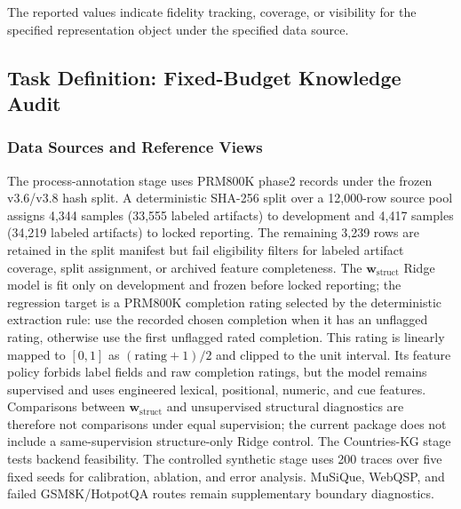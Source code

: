 \documentclass[a4paper,fleqn]{cas-sc}
\newcommand{\wstruct}{\ensuremath{\mathbf{w}_{\mathrm{struct}}}}
\begin{document}
The reported values indicate fidelity tracking, coverage, or visibility for the specified representation object under the specified data source.

\subsection{Task Definition: Fixed-Budget Knowledge Audit}
\label{sec:application-setup}

\subsubsection{Data Sources and Reference Views}

The process-annotation stage uses PRM800K phase2 records under the frozen v3.6/v3.8 hash split. A deterministic SHA-256 split over a 12,000-row source pool assigns 4,344 samples (33,555 labeled artifacts) to development and 4,417 samples (34,219 labeled artifacts) to locked reporting. The remaining 3,239 rows are retained in the split manifest but fail eligibility filters for labeled artifact coverage, split assignment, or archived feature completeness. The \wstruct{} Ridge model is fit only on development and frozen before locked reporting; the regression target is a PRM800K completion rating selected by the deterministic extraction rule: use the recorded chosen completion when it has an unflagged rating, otherwise use the first unflagged rated completion. This rating is linearly mapped to $[0,1]$ as $(\mathrm{rating}+1)/2$ and clipped to the unit interval. Its feature policy forbids label fields and raw completion ratings, but the model remains supervised and uses engineered lexical, positional, numeric, and cue features. Comparisons between \wstruct{} and unsupervised structural diagnostics are therefore not comparisons under equal supervision; the current package does not include a same-supervision structure-only Ridge control. The Countries-KG stage tests backend feasibility. The controlled synthetic stage uses 200 traces over five fixed seeds for calibration, ablation, and error analysis. MuSiQue, WebQSP, and failed GSM8K/HotpotQA routes remain supplementary boundary diagnostics.
\end{document}
